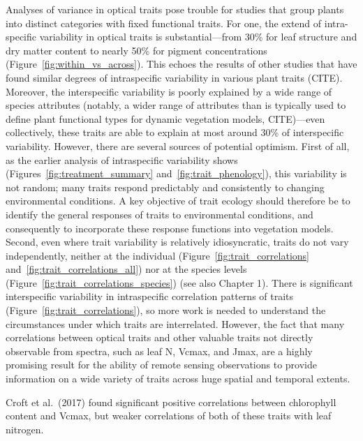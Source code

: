 Analyses of variance in optical traits pose trouble for studies that group plants into distinct categories with fixed functional traits.
For one, the extend of intra-specific variability in optical traits is substantial---from 30\% for leaf structure and dry matter content to nearly 50\% for pigment concentrations (Figure~\ref{fig:within_vs_across}).
% 
% 
This echoes the results of other studies that have found similar degrees of intraspecific variability in various plant traits (CITE).
Moreover, the interspecific variability is poorly explained by a wide range of species attributes (notably, a wider range of attributes than is typically used to define plant functional types for dynamic vegetation models, CITE)---even collectively, these traits are able to explain at most around 30\% of interspecific variability.
However, there are several sources of potential optimism.
First of all, as the earlier analysis of intraspecific variability shows (Figures~\ref{fig:treatment_summary} and~\ref{fig:trait_phenology}), this variability is not random; many traits respond predictably and consistently to changing environmental conditions.
A key objective of trait ecology should therefore be to identify the general responses of traits to environmental conditions, and consequently to incorporate these response functions into vegetation models.
% 
% 
% 
Second, even where trait variability is relatively idiosyncratic, traits do not vary independently, neither at the individual (Figure~\ref{fig:trait_correlations} and~\ref{fig:trait_correlations_all}) nor at the species levels (Figure~\ref{fig:trait_correlations_species}) (see also Chapter 1).
There is significant interspecific variability in intraspecific correlation patterns of traits (Figure~\ref{fig:trait_correlations}), so more work is needed to understand the circumstances under which traits are interrelated.
However, the fact that many correlations between optical traits and other valuable traits not directly observable from spectra, such as leaf N, Vcmax, and Jmax, are a highly promising result for the ability of remote sensing observations to provide information on a wide variety of traits across huge spatial and temporal extents.

Croft et al.~(2017) \nocite{croft_2017_chlorophyll} found significant positive correlations between chlorophyll content and Vcmax, but weaker correlations of both of these traits with leaf nitrogen. %
